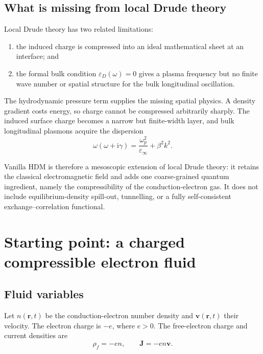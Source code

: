\documentclass[11pt,a4paper]{article}
\newcommand{\J}{\mathbf J}
\newcommand{\ii}{\mathrm i}
\newcommand{\eps}{\varepsilon}
\newcommand{\epsinf}{\varepsilon_\infty}
\newcommand{\omegap}{\omega_p}
\begin{document}
\subsection{What is missing from local Drude theory}

Local Drude theory has two related limitations:
\begin{enumerate}
    \item the induced charge is compressed into an ideal mathematical sheet at
    an interface; and
    \item the formal bulk condition \(\eps_D(\omega)=0\) gives a plasma
    frequency but no finite wave number or spatial structure for the bulk
    longitudinal oscillation.
\end{enumerate}

The hydrodynamic pressure term supplies the missing spatial physics.  A density
gradient costs energy, so charge cannot be compressed arbitrarily sharply.
The induced surface charge becomes a narrow but finite-width layer, and bulk
longitudinal plasmons acquire the dispersion
\begin{equation}
    \omega(\omega+\ii\gamma)
    =\frac{\omegap^2}{\epsinf}+\beta^2 k^2.
    \label{eq:bulk-dispersion-preview}
\end{equation}

Vanilla HDM is therefore a mesoscopic extension of local Drude theory: it
retains the classical electromagnetic field and adds one coarse-grained
quantum ingredient, namely the compressibility of the conduction-electron gas.
It does not include equilibrium-density spill-out, tunnelling, or a fully
self-consistent exchange--correlation functional.

\section{Starting point: a charged compressible electron fluid}

\subsection{Fluid variables}

Let \(n(\mathbf r,t)\) be the conduction-electron number density and
\(\mathbf v(\mathbf r,t)\) their velocity.  The electron charge is \(-e\),
where \(e>0\).  The free-electron charge and current densities are
\begin{equation}
    \rho_f=-e n,
    \qquad
    \J=-e n\mathbf v.
    \label{eq:rho-J-definitions}
\end{equation}
\end{document}
